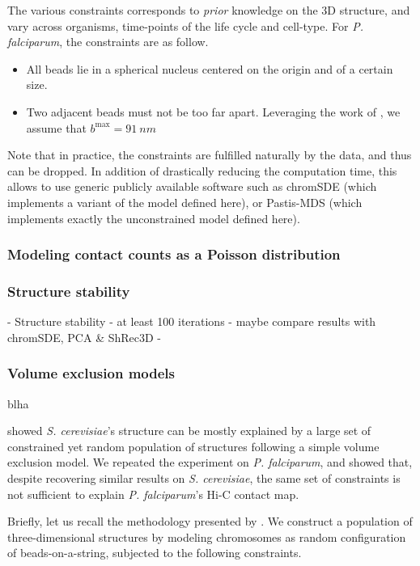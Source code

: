 \documentclass[letterpaper,12pt]{article}
\begin{document}
The various constraints corresponds to {\em prior} knowledge on the 3D
structure, and vary across organisms, time-points of the life cycle and
cell-type. For {\em P. falciparum}, the constraints are as follow.

\begin{itemize}
\item All beads lie in a spherical nucleus centered on the origin and of a
certain size.
\item Two adjacent beads must not be too far apart. Leveraging the work of
\citet{berger:high TOVERIFY}, we assume that $b^\text{max} = 91~nm$
\end{itemize}

Note that in practice, the constraints are fulfilled naturally by the data,
and thus can be dropped. In addition of drastically reducing the computation
time, this allows to use generic publicly available software such as chromSDE
(which implements a variant of the model defined here), or Pastis-MDS (which
implements exactly the unconstrained model defined here).

\subsubsection{Modeling contact counts as a Poisson distribution}



\subsubsection{Structure stability}
- Structure stability
- at least 100 iterations
- maybe compare results with chromSDE, PCA \& ShRec3D 
- 

\subsubsection{Volume exclusion models}
blha

\citet{tjong:physical} showed \textit{S. cerevisiae}'s structure can be mostly
explained by a large set of constrained yet random population of structures
following a simple volume exclusion model. We repeated the experiment on {\em
P. falciparum}, and showed that, despite recovering similar results on {\em S.
cerevisiae}, the same set of constraints is not sufficient to explain {\em P.
falciparum}'s Hi-C contact map. 

Briefly, let us recall the methodology presented by \citet{tjong:physical}. We
construct a population of three-dimensional structures by modeling chromosomes
as random configuration of beads-on-a-string, subjected to the following constraints.
\end{document}
